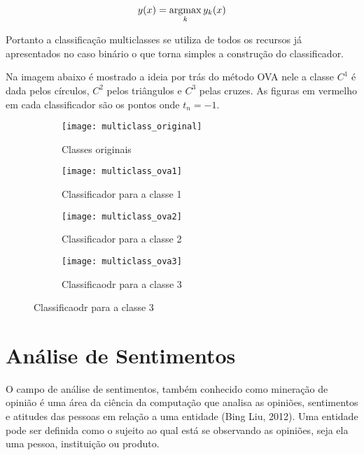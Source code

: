\begin{center}
	\begin{equation}
		y(x) = \operatorname*{argmax}_{k} y_k(x)
	\end{equation}
\end{center}

Portanto a classificação multiclasses se utiliza de todos os recursos já apresentados no caso
binário o que torna simples a construção do classificador.

Na imagem abaixo é mostrado a ideia por trás do método OVA nele a classe $C^1$ é dada pelos círculos,
$C^2$ pelos triângulos e $C^3$ pelas cruzes.
As figuras em vermelho em cada classificador são os pontos onde $t_n = -1$.

\begin{figure}[ht] 
  \begin{subfigure}[b]{0.5\linewidth}
    \centering
    \texttt{[image: multiclass\_original]} 
    \caption{Classes originais} 
    \vspace{4ex}
  \end{subfigure}%
  \begin{subfigure}[b]{0.5\linewidth}
    \centering
    \texttt{[image: multiclass\_ova1]} 
    \caption{Classificador para a classe 1} 
    \vspace{4ex}
  \end{subfigure} 
  \begin{subfigure}[b]{0.5\linewidth}
    \centering
    \texttt{[image: multiclass\_ova2]} 
    \caption{Classificador para a classe 2} 
  \end{subfigure}%
  \begin{subfigure}[b]{0.5\linewidth}
    \centering
    \texttt{[image: multiclass\_ova3]} 
    \caption{Classificaodr para a classe 3} 
  \end{subfigure} 

\end{figure}

\section{Análise de Sentimentos}

O campo de análise de sentimentos, também conhecido como mineração de opinião é uma área da
ciência da computação que analisa as opiniões, sentimentos e atitudes das pessoas em relação
a uma entidade (Bing Liu, 2012)\citep{bingliu2012}. Uma entidade pode ser definida como o sujeito ao qual está
se observando as opiniões, seja ela uma pessoa, instituição ou produto.

